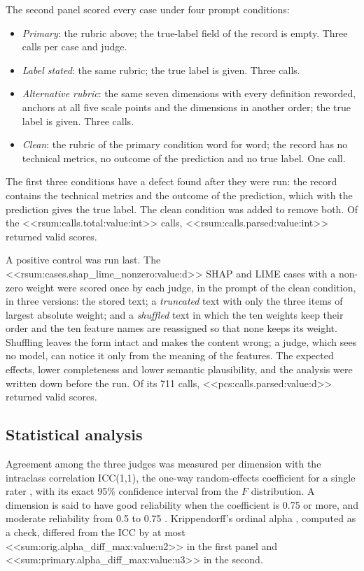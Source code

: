 \documentclass[12pt,letterpaper]{article}
\begin{document}
The second panel scored every case under four prompt conditions:

\begin{itemize}
\item \emph{Primary}: the rubric above; the true-label field of the record is empty.
Three calls per case and judge.
\item \emph{Label stated}: the same rubric; the true label is given. Three calls.
\item \emph{Alternative rubric}: the same seven dimensions with every definition
reworded, anchors at all five scale points and the dimensions in another order; the true
label is given. Three calls.
\item \emph{Clean}: the rubric of the primary condition word for word; the record has no
technical metrics, no outcome of the prediction and no true label. One call.
\end{itemize}

The first three conditions have a defect found after they were run: the record
contains the technical metrics and the outcome of the prediction, which with the
prediction gives the true label. The clean condition was added to remove both. Of the <<rsum:calls.total:value:int>> calls,
<<rsum:calls.parsed:value:int>> returned valid scores.

A positive control was run last. The
<<rsum:cases.shap_lime_nonzero:value:d>> SHAP and LIME cases with a non-zero weight were
scored once by each judge, in the prompt of the clean condition, in three versions: the
stored text; a \emph{truncated} text with only the three items of largest absolute
weight; and a \emph{shuffled} text in which the ten weights keep their order and the ten
feature names are reassigned so that none keeps its weight. Shuffling leaves the form
intact and makes the content wrong; a judge, which sees no model, can notice it only
from the meaning of the features. The expected effects, lower completeness and lower semantic plausibility, and
the analysis were written down before the run. Of its 711 calls,
<<pcs:calls.parsed:value:d>> returned valid scores.

\subsection{Statistical analysis}

Agreement among the three judges was measured per dimension with the intraclass
correlation ICC(1,1), the one-way random-effects coefficient for a single rater
\cite{shrout1979intraclass}, with its exact 95\% confidence interval from the $F$
distribution. A dimension is said to have good reliability when the coefficient is 0.75
or more, and moderate reliability from 0.5 to 0.75 \cite{koo2016guideline}. Krippendorff's ordinal alpha
\cite{krippendorff2004reliability}, computed as a check, differed from the ICC by at
most <<sum:orig.alpha_diff_max:value:u2>> in the first panel and
<<sum:primary.alpha_diff_max:value:u3>> in the second.
\end{document}

